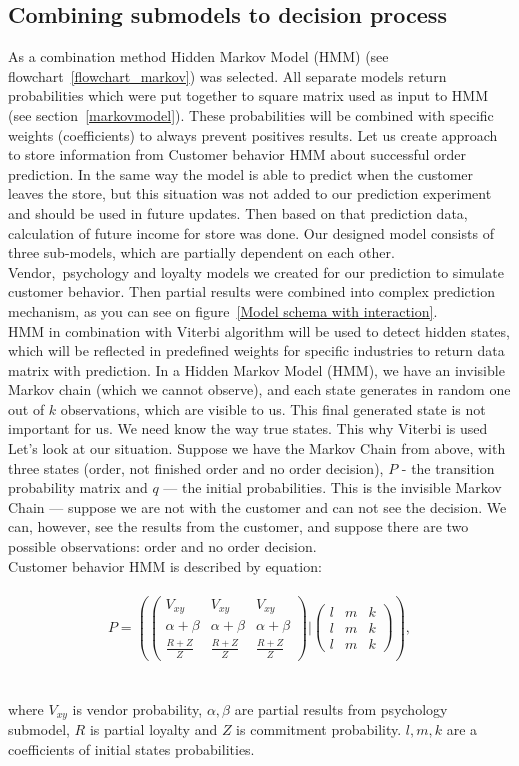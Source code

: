 \subsection{Combining submodels to decision process} \label{subsec:combining_models}
As a combination method Hidden Markov Model (HMM) (see flowchart~\ref{flowchart_markov}) was selected.
All separate models return probabilities which were put together to square matrix used as input to HMM (see section~\ref{markovmodel}).
These probabilities will be combined with specific weights (coefficients) to always prevent positives results.
Let us create approach to store information from Customer behavior HMM about successful order prediction.
In the same way the model is able to predict when the customer leaves the store, but this situation was not added to our prediction experiment and should be used in future updates.
Then based on that prediction data, calculation of future income for store was done.
Our designed model consists of three sub-models, which are partially dependent on each other.
Vendor,\ psychology and loyalty models we created for our prediction to simulate customer behavior.
Then partial results were combined into complex prediction mechanism, as you can see on figure~\ref{Model schema with interaction}.
\\
HMM in combination with Viterbi algorithm will be used to detect hidden states, which will be reflected in predefined weights for specific
industries to return data matrix with prediction.
In a Hidden Markov Model (HMM), we have an invisible Markov chain (which we cannot observe), and each state
generates in random one out of $k$ observations, which are visible to us. This final generated state is not important for us.
We need know the way true states. This why Viterbi is used
Let’s look at our situation.
Suppose we have the Markov Chain from above, with three states (order, not finished order and no order decision),
$P$ - the transition probability matrix and $q$ — the initial probabilities.
This is the invisible Markov Chain — suppose we are not with the customer and can not see the decision.
We can, however, see the results from the customer, and suppose there are two possible observations: order and no order decision.\\
Customer behavior HMM is described by equation:\\
\\
\begin{equation} \label{eq:25}
P = \left(
\begin{pmatrix}
    V_{xy} & V_{xy} & V_{xy} \\
    \alpha + \beta & \alpha + \beta & \alpha + \beta \\
    \frac{R + Z}{Z} & \frac{R + Z}{Z} & \frac{R + Z}{Z}
\end{pmatrix}|
\begin{pmatrix}
    l & m & k \\
    l & m & k \\
    l & m & k
\end{pmatrix}
\right),
\end{equation}\\
\\
where $V_{xy}$ is vendor probability, $\alpha, \beta$ are partial results from psychology submodel, $R$ is partial
loyalty and $Z$ is commitment probability. $l,m,k$ are a coefficients of initial states probabilities.
